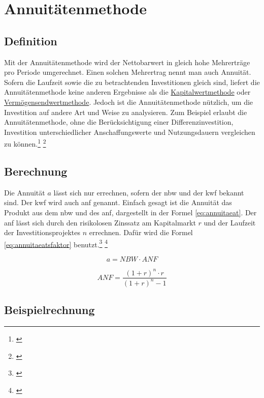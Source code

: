 \chapter{Annuitätenmethode}
\label{Annuitaetenmethode}

\section{Definition}


Mit der Annuitätenmethode wird der Nettobarwert in gleich hohe Mehrerträge pro Periode umgerechnet. Einen solchen Mehrertrag nennt man auch Annuität. Sofern die Laufzeit sowie die zu betrachtenden Investitionen gleich sind, liefert die Annuitätenmethode keine anderen Ergebnisse als die \hyperref[Kapitalwertmethode]{Kapitalwertmethode} oder \hyperref[Vermoegensendwertmethode]{Vermögensendwertmethode}. Jedoch ist die Annuitätenmethode nützlich, um die Investition auf andere Art und Weise zu analysieren. Zum Beispiel erlaubt die Annuitätenmethode, ohne die Berücksichtigung einer Differenzinvestition, Investition unterschiedlicher Anschaffungswerte und Nutzungsdauern vergleichen zu können.\footnote{\cite{bwllexicon-annu}} \footnote{\cite{wikipedia-annu}}


\section{Berechnung}

Die Annuität $a$ lässt sich nur errechnen, sofern der \ac{nbw} und der \linebreak \ac{kwf} bekannt sind. Der \ac{kwf} wird auch \ac{anf} genannt. Einfach gesagt ist die Annuität das Produkt aus dem \ac{nbw} und des \ac{anf}, dargestellt in der Formel \eqref{eq:annuitaeat}. Der \ac{anf} lässt sich durch den risikolosen Zinssatz am Kapitalmarkt $r$ und der Laufzeit der Investitionsprojektes $n$ errechnen. Dafür wird die Formel \eqref{eq:annuitaeatsfaktor} benutzt.\footnote{\cite{studyflix-annu}} \footnote{\cite{bwllexicon-annu}}

\begin{equation}
    a = NBW \cdot ANF
    \label{eq:annuitaeat}
\end{equation}

\begin{equation}
    ANF = \frac{ (1 + r)^n \cdot r }{ (1 + r)^n - 1 }
    \label{eq:annuitaeatsfaktor}
\end{equation}

\section{Beispielrechnung}

